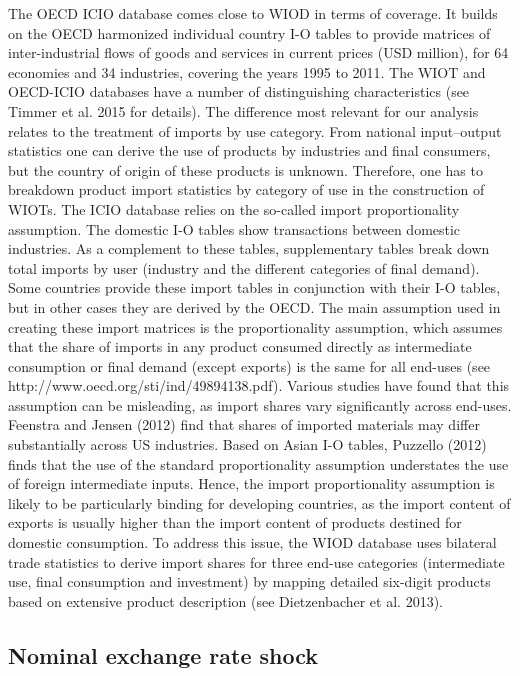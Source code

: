 \documentclass[11pt,a4paper]{article}
\begin{document}
The OECD ICIO database comes close to WIOD in terms of coverage. It builds on the OECD harmonized individual country I-O tables to provide matrices of inter-industrial flows of goods and services in current prices (USD million), for 64 economies and 34 industries, covering the years 1995 to 2011. 
The WIOT and OECD-ICIO databases have a number of distinguishing characteristics (see Timmer et al. 2015 for details). The difference most relevant for our analysis relates to the treatment of imports by use category. From national input–output statistics one can derive the use of products by industries and final consumers, but the country of origin of these products is unknown. Therefore, one has to breakdown product import statistics by category of use in the construction of WIOTs.
The ICIO database relies on the so-called import proportionality assumption. The domestic I-O tables show transactions between domestic industries. As a complement to these tables, supplementary tables break down total imports by user (industry and the different categories of final demand). Some countries provide these import tables in conjunction with their I-O tables, but in other cases they are derived by the OECD. The main assumption used in creating these import matrices is the proportionality assumption, which assumes that the share of imports in any product consumed directly as intermediate consumption or final demand (except exports) is the same for all end-uses (see http://www.oecd.org/sti/ind/49894138.pdf). Various studies have found that this assumption can be misleading, as import shares vary significantly across end-uses. Feenstra and Jensen (2012) find that shares of imported materials may differ substantially across US industries. Based on Asian I-O tables, Puzzello (2012) finds that the use of the standard proportionality assumption understates the use of foreign intermediate inputs. Hence, the import proportionality assumption is likely to be particularly binding for developing countries, as the import content of exports is usually higher than the import content of products destined for domestic consumption. To address this issue, the WIOD database uses bilateral trade statistics to derive import shares for three end-use categories (intermediate use, ﬁnal consumption and investment) by mapping detailed six-digit products based on extensive product description (see Dietzenbacher et al. 2013).

\subsection{Nominal exchange rate shock }
\label{subsec:chocchange}
\end{document}
